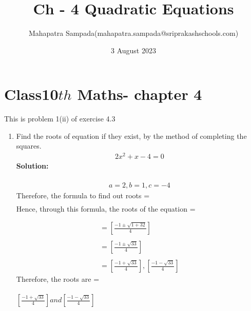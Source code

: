 \documentclass{article}
\title{Ch - 4 Quadratic Equations}
\author{Mahapatra Sampada(mahapatra.sampada@sriprakashschools.com)}
\date{3 August 2023}
\newcommand{\solution}{\noindent \textbf{Solution: }}
\begin{document}
\maketitle
\section*{Class10${th}$ Maths- chapter 4}
This is problem 1(ii) of exercise 4.3
\begin{enumerate}
\item Find the roots of equation if they exist, by the method of completing the squares.
\begin{align}
2x^2+x-4=0
\end{align}
\solution\\\\
\begin{align}
a=2 , b=1 , c=-4
\end{align}
Therefore, the formula to find out roots = 
\begin{align}
[\frac{-b\pm\sqrt{(b^2)-4ac}}{2a}]
\end{align}
Hence, through this formula, the roots of the equation = 
\begin{align}
[\frac{1\pm\sqrt{(1^2)-4\times 2\times -4}}{2\times 2}] \\\\
=[\frac{-1\pm\sqrt{1+32}}{4}]\\\\
=[\frac{-1\pm\sqrt{33}}{4}]\\\\
=[\frac{-1+\sqrt{33}}{4}],[\frac{-1-\sqrt{33}}{4}]
\end{align}
Therefore, the roots are = \\\\
$[\frac{-1+\sqrt{33}}{4}] and [\frac{-1-\sqrt{33}}{4}]$


\end{enumerate}
\end{document}
